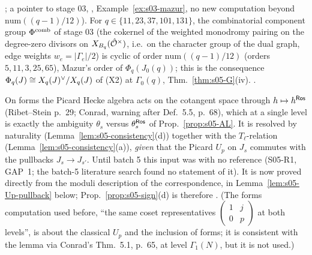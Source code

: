 \begin{remark}
\begin{enumerate}[label=(\arabic*)]
  ; a pointer to stage 03, ,
  Example~\ref{ex:s03-mazur}, no new computation beyond $\mathrm{num}((q-1)/12)$). For $q\in\{11,23,37,101,131\}$, the combinatorial
  component group $\Phi^{\mathrm{comb}}$ of stage 03 (the cokernel of the weighted monodromy pairing on the degree-zero divisors on $X_{B_q}(\hat{\mathcal{O}}^\times)$,
  i.e.\ on the character group of the dual graph, edge weights $w_e=|\Gamma_e|/2$) is cyclic of order $\mathrm{num}((q-1)/12)$ (orders
  $5,11,3,25,65$), Mazur's order of $\Phi_q(J_0(q))$; this is the consequence $\Phi_q(J)\cong X_q(J)^\vee/X_q(J)$ of (X2) at $\Gamma_0(q)$,
  Thm.~\ref{thm:s05-G}(iv). \stcomp.
\end{enumerate}
\end{remark}

\begin{remark}\label{rem:s05-delta}
On forms the Picard Hecke algebra acts on the cotangent space through $h\mapsto h^{\mathsf{Ros}}$ (Ribet--Stein p.~29; Conrad, warning after
Def.~5.5, p.~68), which at a single level is exactly the ambiguity $\theta_s$ versus $\theta^{\mathsf{Ros}}_s$ of Prop.~\ref{prop:s05-AL}. It is resolved by
naturality (Lemma~\ref{lem:s05-consistency}(d)) together with the $T_\ell$-relation (Lemma~\ref{lem:s05-consistency}(a)), \emph{given} that the
Picard $U_p$ on $J_s$ commutes with the pullbacks $J_s\to J_{s'}$. Until batch 5 this input was \stexp{} with no reference (S05-R1, GAP~1; the
batch-5 literature search found no statement of it). It is now proved directly from the moduli description of the correspondence, in
Lemma~\ref{lem:s05-Up-pullback} below; Prop.~\ref{prop:s05-sign}(d) is therefore \stpmc. (The forms computation used before, ``the same coset
representatives $\left(\begin{smallmatrix}1&j\\0&p\end{smallmatrix}\right)$ at both levels'', is about the classical $U_p$ and the inclusion of
forms; it is consistent with the lemma via Conrad's Thm.~5.1, p.~65, at level $\Gamma_1(N)$, but it is not used.)
\end{remark}

